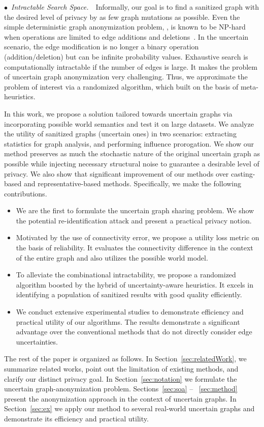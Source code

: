 $\bullet$~\textup{\emph{Intractable Search Space.}}~~Informally, our goal is to find a sanitized graph with the desired level of privacy by as few graph mutations as possible. 
Even the simple deterministic graph anonymization problem, {\ie}, is known to be NP-hard when operations are limited to edge additions and deletions~\cite{Hartung_Theory_2015}. 
In the uncertain scenario, the edge modification is no longer a binary operation (addition/deletion) but can be infinite probability values. 
Exhaustive search is computationally intractable if the number of edges is large. 
It makes the problem of uncertain graph anonymization very challenging. 
Thus, we approximate the problem of interest via a randomized algorithm, which built on the basis of meta-heuristics. 

In this work, we propose a solution tailored towards uncertain graphs via incorporating possible world semantics and test it on large datasets. We analyze the utility of sanitized graphs (uncertain ones) in two scenarios: extracting statistics for graph analysis, and performing influence prorogation. We show our method preserves as much the stochastic nature of the original uncertain graph as possible while injecting necessary structural noise to guarantee a desirable level of privacy. We also show that significant improvement of our methods over casting-based and representative-based methods. 
Specifically, we make the following contributions.
\begin{itemize}
\item We are the first to formulate the uncertain graph sharing problem. 
 We show the potential re-identification attack and present a practical privacy notion. 
\item Motivated by the use of connectivity error, we propose a utility loss metric on the basis of reliability. It evaluates the connectivity difference in the context of the entire graph and also utilizes the possible world model. 
\item To alleviate the combinational intractability, we propose a randomized algorithm boosted by the hybrid of uncertainty-aware heuristics. It excels in identifying a population of sanitized results with good quality efficiently.
\item We conduct extensive experimental studies to demonstrate efficiency and practical utility of our algorithms. The results demonstrate a significant advantage over the conventional methods that do not directly consider edge uncertainties.
\end{itemize}

The rest of the paper is organized as follows. In Section~\ref{sec:relatedWork}, we summarize related works, point out the limitation of existing methods, and clarify our distinct privacy goal. In Section~\ref{sec:notation} we formulate the uncertain graph-anonymization problem. Sections~\ref{sec:soa} – ~\ref{sec:method} present the anonymization approach in the context of uncertain graphs.  In Section~\ref{sec:ex} we apply our method to several real-world uncertain graphs and demonstrate its efficiency and practical utility. 